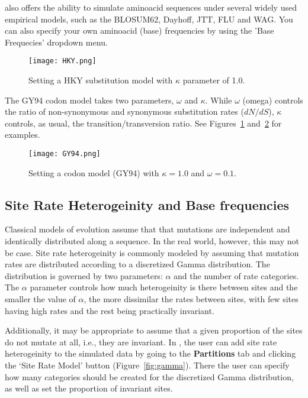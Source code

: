 {\bussname} also offers the ability to simulate aminoacid sequences under several widely used empirical models, such as the BLOSUM62, Dayhoff, JTT, FLU and WAG. You can also specify your own aminoacid (base) frequencies by using the 'Base Frequecies' dropdown menu.  

\begin{figure}[H]
\begin{center}
\texttt{[image: HKY.png]} 
\end{center}
\caption{Setting a HKY substitution model with $\kappa$ parameter of 1.0.}
\label{fig:hky}
\end{figure}

The GY94 codon model takes two parameters, $\omega$ and $\kappa$. 
While $\omega$ (omega) controls the ratio of non-synonymous and synonymous substitution rates ($dN/dS$), $\kappa$ controls, as usual, the transition/transversion ratio. 
See Figures~\ref{fig:hky} and~\ref{fig:gy94} for examples.

\begin{figure}[H]
\centering
\texttt{[image: GY94.png]} 
\caption{Setting a codon model (GY94) with $\kappa=1.0$ and $\omega=0.1$.}
\label{fig:gy94}
\end{figure}

\subsection{Site Rate Heterogeinity and Base frequencies}

Classical models of evolution assume that that mutations are independent and identically distributed along a sequence. 
In the real world, however, this may not be case. 
Site rate heterogeinity is commonly modeled by assuming that mutation rates are distributed according to a discretized Gamma distribution.
The distribution is governed by two parameters: $\alpha$ and the number of rate categories. 
The $\alpha$ parameter controls how much heterogeinity is there between sites and the smaller the value of $\alpha$, the more dissimilar the rates between sites, with few sites having high rates and the rest being practically invariant.

Additionally, it may be appropriate to assume that a given proportion of the sites do not mutate at all, i.e., they are invariant. 
In {\bussname}, the user can add site rate heterogeinity to the simulated data by going to the \textbf{Partitions} tab and clicking the `Site Rate Model' button (Figure~\ref{fig:gamma}). 
There the user can specify how many categories should be created for the discretized Gamma distribution, as well as set the proportion of invariant sites.

